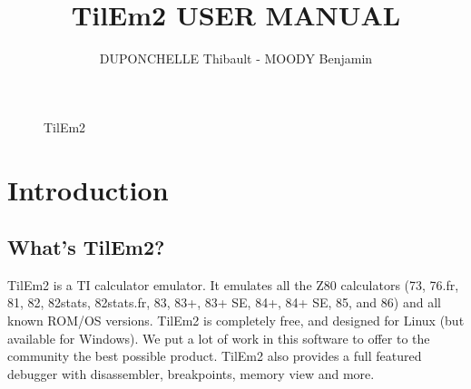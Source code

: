 \documentclass[10pt]{report}
\title {TilEm2 USER MANUAL}
\author {DUPONCHELLE Thibault - MOODY Benjamin}
\begin{document}
\maketitle

\begin{figure}[H]
\centering
{}
\caption{TilEm2}
\end{figure}


\tableofcontents

\chapter{Introduction}
\section{What's TilEm2?}
TilEm2 is a TI calculator emulator. It emulates all the Z80 calculators (73, 76.fr, 81, 82, 82stats, 82stats.fr, 83, 83+, 83+ SE, 84+, 84+ SE, 85, and 86) and all known ROM/OS versions.\newline
TilEm2 is completely free, and designed for Linux (but available for Windows).\newline
We put a lot of work in this software to offer to the community the best possible product.\newline
TilEm2 also provides a full featured debugger with disassembler, breakpoints, memory view and more.\newline
\end{document}
